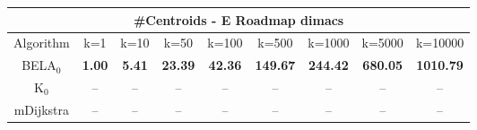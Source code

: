 \begin{tabular}{c|cccccccc}\toprule
\multicolumn{9}{c}{#Centroids - E Roadmap dimacs}\\ \midrule
Algorithm & k=1 & k=10 & k=50 & k=100 & k=500 & k=1000 & k=5000 & k=10000 \\ \midrule
BELA$_0$ & \textbf{1.00} & \textbf{5.41} & \textbf{23.39} & \textbf{42.36} & \textbf{149.67} & \textbf{244.42} & \textbf{680.05} & \textbf{1010.79} \\
K$_0$ & -- & -- & -- & -- & -- & -- & -- & -- \\
mDijkstra & -- & -- & -- & -- & -- & -- & -- & -- \\ \bottomrule 
\end{tabular}
